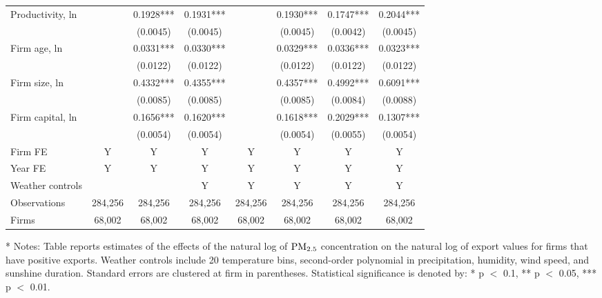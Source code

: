 \documentclass[12pt]{article}
\begin{document}
\begin{table}[H]
{\begin{tabular}{l*{7}{c}}
    Productivity, ln      &              &0.1928***   &0.1931***      &              &   0.1930***  &0.1747*** & 0.2044***\\
                         &             &(0.0045)    &(0.0045)       &              &  (0.0045)    &(0.0042)  & (0.0045)\\
    Firm age, ln        &             &0.0331***   &0.0330***      &               &  0.0329***   &0.0336*** & 0.0323***\\
                         &             &(0.0122)    &(0.0122)       &              &  (0.0122)    &(0.0122)  & (0.0122)\\
    Firm size, ln       &             &0.4332***   &0.4355***      &               &  0.4357***   &0.4992*** & 0.6091***\\
                         &             &(0.0085)    &(0.0085)       &              &  (0.0085)    &(0.0084)  & (0.0088)\\
    Firm capital, ln    &             &0.1656***   &0.1620***      &               &  0.1618***   &0.2029*** & 0.1307***\\
                         &             &(0.0054)    &(0.0054)       &              &  (0.0054)    &(0.0055)  & (0.0054)\\
    \hline
    Firm FE          &Y&Y&Y&Y&Y&Y&Y\\
    Year FE          &Y&Y&Y&Y&Y&Y&Y\\
    Weather controls & & &Y&Y&Y&Y&Y\\
    \hline
    Observations   &284,256   &284,256 &284,256 &284,256 &284,256 &284,256&284,256\\
    Firms          &68,002    &68,002  &68,002  &68,002  &68,002  &68,002 &68,002\\
    \hline\hline
  \end{tabular}
  }
  \begin{tablenotes}
    \item[*] \small Notes: Table reports estimates of the effects of the natural log of $\rm PM_{2.5}$ concentration on the natural log of export values for firms that have positive exports. Weather controls include 20 temperature bins, second-order polynomial in precipitation, humidity, wind speed, and sunshine duration. Standard errors are clustered at firm in parentheses. Statistical significance is denoted by: * p $<$ 0.1, ** p $<$ 0.05, *** p $<$ 0.01.
  \end{tablenotes}
\end{table}
\end{document}
